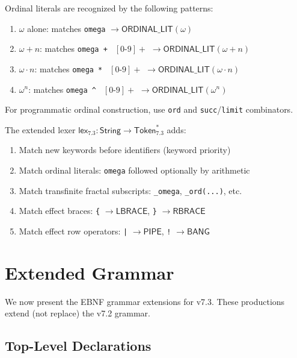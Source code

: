 \begin{definition}
\label{def:ordinal-literal-lex}
Ordinal literals are recognized by the following patterns:
\begin{enumerate}
  \item $\omega$ alone: matches \texttt{omega} $\to \mathsf{ORDINAL\_LIT}(\omega)$
  \item $\omega + n$: matches \texttt{omega + } $[0\text{-}9]+$ $\to \mathsf{ORDINAL\_LIT}(\omega + n)$
  \item $\omega \cdot n$: matches \texttt{omega * } $[0\text{-}9]+$ $\to \mathsf{ORDINAL\_LIT}(\omega \cdot n)$
  \item $\omega^n$: matches \texttt{omega \^{} } $[0\text{-}9]+$ $\to \mathsf{ORDINAL\_LIT}(\omega^n)$
\end{enumerate}
For programmatic ordinal construction, use \texttt{ord} and \texttt{succ}/\texttt{limit} combinators.
\end{definition}

\begin{definition}
\label{def:lexer-extension}
The extended lexer $\mathsf{lex}_{7.3} : \mathsf{String} \to \mathsf{Token}_{7.3}^*$ adds:
\begin{enumerate}
  \item Match new keywords before identifiers (keyword priority)
  \item Match ordinal literals: \texttt{omega} followed optionally by arithmetic
  \item Match transfinite fractal subscripts: \texttt{\_omega}, \texttt{\_ord(...)}, etc.
  \item Match effect braces: \texttt{\{} $\to \mathsf{LBRACE}$, \texttt{\}} $\to \mathsf{RBRACE}$
  \item Match effect row operators: \texttt{|} $\to \mathsf{PIPE}$, \texttt{!} $\to \mathsf{BANG}$
\end{enumerate}
\end{definition}

\section{Extended Grammar}
\label{sec:extended-grammar}

We now present the EBNF grammar extensions for v7.3. These productions extend (not replace) the v7.2 grammar.

\subsection{Top-Level Declarations}
\label{subsec:toplevel-grammar}

